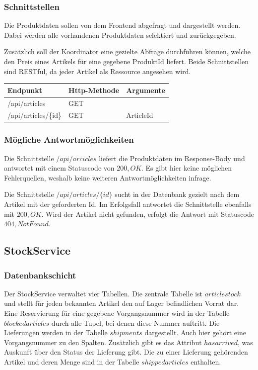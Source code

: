 \subsubsection{Schnittstellen} %
Die Produktdaten sollen von dem Frontend abgefragt und dargestellt werden. Dabei werden alle vorhandenen Produktdaten selektiert und zurückgegeben. 

Zusätzlich soll der Koordinator eine gezielte Abfrage durchführen können, welche den Preis eines Artikels für eine gegebene ProduktId liefert. Beide Schnittstellen sind RESTful, da jeder Artikel als Ressource angesehen wird. 

\begin{center}
	\begin{tabular}[h]{|p{3.5cm}|p{3cm}|p{2cm}|}
	\hline
	Endpunkt & Http-Methode & Argumente \\ \hline
	/api/articles & GET & \\ \hline
	/api/articles/\{id\} & GET & ArticleId \\ \hline
\end{tabular}
\end{center}
\FloatBarrier

\subsubsection{Mögliche Antwortmöglichkeiten}
Die Schnittstelle  $/api/arcicles$ liefert die Produktdaten im Response-Body und antwortet mit einem Statuscode von $200, OK$. Es gibt hier keine möglichen Fehlerquellen, weshalb keine weiteren Antwortmöglichkeiten infrage.

Die Schnittstelle $/api/articles/\{id\}$ sucht in der Datenbank gezielt nach dem Artikel mit der geforderten Id. Im Erfolgsfall antwortet die Schnittstelle ebenfalls mit $200, OK$. Wird der Artikel nicht gefunden, erfolgt die Antwort mit Statuscode $404, Not Found$.

\subsection{StockService}
\subsubsection{Datenbankschicht}

Der StockService verwaltet vier Tabellen. Die zentrale Tabelle ist $articlestock$ und stellt für jeden bekannten Artikel den auf Lager befindlichen Vorrat dar. Eine Reservierung für eine gegebene Vorgangsnummer wird in der Tabelle $blockedarticles$ durch alle Tupel, bei denen diese Nummer auftritt. Die Lieferungen werden in der Tabelle $shipments$ dargestellt. Auch hier gehört eine Vorgangsnummer zu den Spalten. Zusätzlich gibt es das Attribut $hasarrived$, was Auskunft über den Status der Lieferung gibt. Die zu einer Lieferung gehörenden Artikel und deren Menge sind in der Tabelle $shippedarticles$ enthalten.

